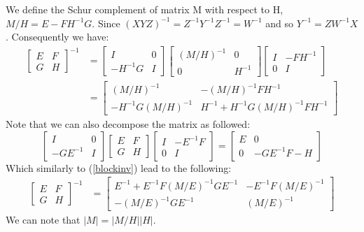 \documentclass[11pt]{article}
\begin{document}
We define the Schur complement of matrix M with respect to H, $M/H = E-FH^{-1}G$. Since $(XYZ)^{-1}=Z^{-1}Y^{-1}Z^{-1}=W^{-1}$ and so $Y^{-1}=ZW^{-1}X$. Consequently we have:
\begin{align}
\left[ \begin{array}{cc} E & F \\ G & H \end{array} \right]^{-1}
&=
\left[ \begin{array}{cc} I & 0 \\ -H^{-1}G & I \end{array} \right]
\left[ \begin{array}{cc} (M/H)^{-1} & 0 \\ 0 & H^{-1} \end{array} \right]
\left[ \begin{array}{cc} I & -FH^{-1} \\ 0 & I \end{array} \right] \nonumber\\
&=
\left[ \begin{array}{cc} (M/H)^{-1} & -(M/H)^{-1}FH^{-1} \\
-H^{-1}G(M/H)^{-1} & H^{-1}+H^{-1}G(M/H)^{-1}FH^{-1} \end{array} \right] \label{blockinv}
\end{align}
Note that we can also decompose the matrix as followed:
$$
\left[ \begin{array}{cc} I & 0 \\ -GE^{-1} & I \end{array} \right]
\left[ \begin{array}{cc} E & F \\ G & H \end{array} \right]
\left[ \begin{array}{cc} I & -E^{-1}F \\ 0 & I \end{array} \right]
=
\left[ \begin{array}{cc} E & 0 \\ 0 & -GE^{-1}F - H \end{array} \right]
$$
Which similarly to (\ref{blockinv}) lead to the following:
\begin{align}
\left[ \begin{array}{cc} E & F \\ G & H \end{array} \right]^{-1}
&=
\left[ \begin{array}{cc} E^{-1} + E^{-1}F(M/E)^{-1}GE^{-1} & -E^{-1}F(M/E)^{-1} \\ -(M/E)^{-1}GE^{-1} & (M/E)^{-1} \end{array} \right] \label{blockinv2}
\end{align}
We can note that $|M|=|M/H||H|$.
\end{document}
